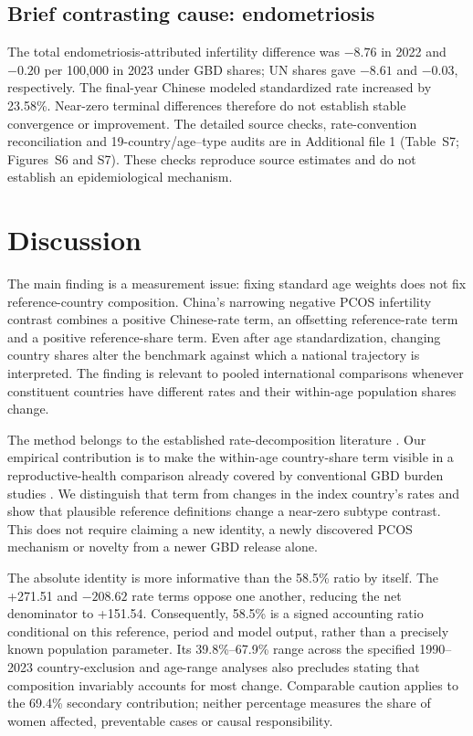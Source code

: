 \documentclass[11pt,a4paper]{article}
\begin{document}
\subsection{Brief contrasting cause: endometriosis}
The total endometriosis-attributed infertility difference was $-8.76$ in 2022 and $-0.20$ per 100,000 in 2023 under GBD shares; UN shares gave $-8.61$ and $-0.03$, respectively. The final-year Chinese modeled standardized rate increased by 23.58\%. Near-zero terminal differences therefore do not establish stable convergence or improvement. The detailed source checks, rate-convention reconciliation and 19-country/age--type audits are in Additional file 1 (Table~S7; Figures~S6 and S7). These checks reproduce source estimates and do not establish an epidemiological mechanism.

\section{Discussion}
The main finding is a measurement issue: fixing standard age weights does not fix reference-country composition. China's narrowing negative PCOS infertility contrast combines a positive Chinese-rate term, an offsetting reference-rate term and a positive reference-share term. Even after age standardization, changing country shares alter the benchmark against which a national trajectory is interpreted. The finding is relevant to pooled international comparisons whenever constituent countries have different rates and their within-age population shares change.

The method belongs to the established rate-decomposition literature \cite{kitagawa}. Our empirical contribution is to make the within-age country-share term visible in a reproductive-health comparison already covered by conventional GBD burden studies \cite{liu_pcos2024,liang_burden2025,liang_trend2026,xu}. We distinguish that term from changes in the index country's rates and show that plausible reference definitions change a near-zero subtype contrast. This does not require claiming a new identity, a newly discovered PCOS mechanism or novelty from a newer GBD release alone.

The absolute identity is more informative than the 58.5\% ratio by itself. The +271.51 and $-208.62$ rate terms oppose one another, reducing the net denominator to +151.54. Consequently, 58.5\% is a signed accounting ratio conditional on this reference, period and model output, rather than a precisely known population parameter. Its 39.8\%--67.9\% range across the specified 1990--2023 country-exclusion and age-range analyses also precludes stating that composition invariably accounts for most change. Comparable caution applies to the 69.4\% secondary contribution; neither percentage measures the share of women affected, preventable cases or causal responsibility.
\end{document}

